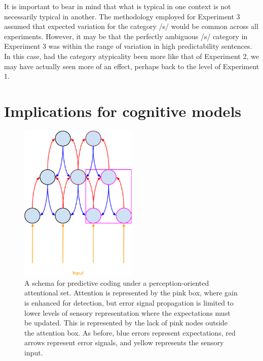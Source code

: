 It is important to bear in mind that what is typical in one context is not necessarily typical in another.  
The methodology employed for Experiment 3 assumed that expected variation for the category /s/ would be common across all experiments.  
However, it may be that the perfectly ambiguous /s/ category in Experiment 3 was within the range of variation in high predictability sentences. 
In this case, had the category atypicality been more like that of Experiment 2, we may have actually seen more of an effect, perhaps back to the level of Experiment 1.

\section{Implications for cognitive models}

\begin{figure}[!ht]
\caption{A schema for predictive coding under a perception-oriented attentional set.  Attention is represented by the pink box, where gain is enhanced for detection, but error signal propagation is limited to lower levels of sensory representation where the expectations must be updated.  This is represented by the lack of pink nodes outside the attention box.  As before, blue errors represent expectations, red arrows represent error signals, and yellow represents the sensory input.}
\label{fig:predictivecodingperception2}
\begin{center}
\includegraphics[width=0.5\textwidth]{pictures/perception_predictive_coding}
\end{center}
\end{figure}

